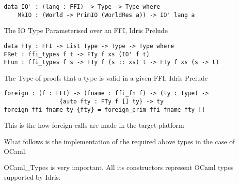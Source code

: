\begin{listing}[H]
    \begin{verbatim}
data IO' : (lang : FFI) -> Type -> Type where
    MkIO : (World -> PrimIO (WorldRes a)) -> IO' lang a
    \end{verbatim}
    \caption{The IO Type Parameterised over an FFI, Idris Prelude}
\end{listing}

\begin{listing}[H]
    \begin{verbatim}
data FTy : FFI -> List Type -> Type -> Type where
FRet : ffi_types f t -> FTy f xs (IO' f t)
FFun : ffi_types f s -> FTy f (s :: xs) t -> FTy f xs (s -> t)
    \end{verbatim}
    \caption{The Type of proofs that a type is valid in a given FFI, Idris Prelude}
\end{listing}

\begin{listing}[H]
    \begin{verbatim}
foreign : (f : FFI) -> (fname : ffi_fn f) -> (ty : Type) -> 
                {auto fty : FTy f [] ty} -> ty
foreign ffi fname ty {fty} = foreign_prim ffi fname fty []
    \end{verbatim}
    \caption{This is the how foreign calls are made in the target platform}
\end{listing}

What follows is the implementation of the required above types in the 
case of OCaml.

OCaml\_Types is very important. All its constructors represent
OCaml types supported by Idris. 

